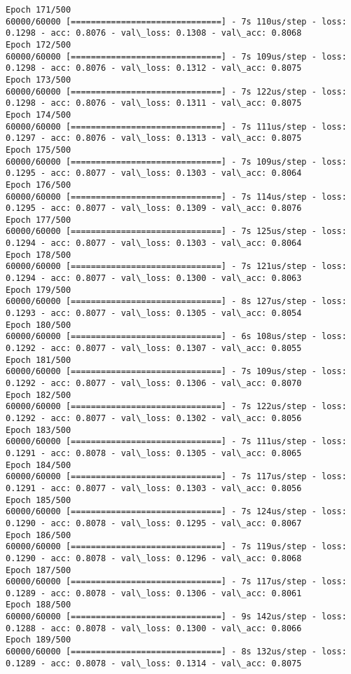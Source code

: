 \documentclass[11pt]{article}
\begin{document}
\begin{Verbatim}[commandchars=\\\{\}]
Epoch 171/500
60000/60000 [==============================] - 7s 110us/step - loss: 0.1298 - acc: 0.8076 - val\_loss: 0.1308 - val\_acc: 0.8068
Epoch 172/500
60000/60000 [==============================] - 7s 109us/step - loss: 0.1298 - acc: 0.8076 - val\_loss: 0.1312 - val\_acc: 0.8075
Epoch 173/500
60000/60000 [==============================] - 7s 122us/step - loss: 0.1298 - acc: 0.8076 - val\_loss: 0.1311 - val\_acc: 0.8075
Epoch 174/500
60000/60000 [==============================] - 7s 111us/step - loss: 0.1297 - acc: 0.8076 - val\_loss: 0.1313 - val\_acc: 0.8075
Epoch 175/500
60000/60000 [==============================] - 7s 109us/step - loss: 0.1295 - acc: 0.8077 - val\_loss: 0.1303 - val\_acc: 0.8064
Epoch 176/500
60000/60000 [==============================] - 7s 114us/step - loss: 0.1295 - acc: 0.8077 - val\_loss: 0.1309 - val\_acc: 0.8076
Epoch 177/500
60000/60000 [==============================] - 7s 125us/step - loss: 0.1294 - acc: 0.8077 - val\_loss: 0.1303 - val\_acc: 0.8064
Epoch 178/500
60000/60000 [==============================] - 7s 121us/step - loss: 0.1294 - acc: 0.8077 - val\_loss: 0.1300 - val\_acc: 0.8063
Epoch 179/500
60000/60000 [==============================] - 8s 127us/step - loss: 0.1293 - acc: 0.8077 - val\_loss: 0.1305 - val\_acc: 0.8054
Epoch 180/500
60000/60000 [==============================] - 6s 108us/step - loss: 0.1292 - acc: 0.8077 - val\_loss: 0.1307 - val\_acc: 0.8055
Epoch 181/500
60000/60000 [==============================] - 7s 109us/step - loss: 0.1292 - acc: 0.8077 - val\_loss: 0.1306 - val\_acc: 0.8070
Epoch 182/500
60000/60000 [==============================] - 7s 122us/step - loss: 0.1292 - acc: 0.8077 - val\_loss: 0.1302 - val\_acc: 0.8056
Epoch 183/500
60000/60000 [==============================] - 7s 111us/step - loss: 0.1291 - acc: 0.8078 - val\_loss: 0.1305 - val\_acc: 0.8065
Epoch 184/500
60000/60000 [==============================] - 7s 117us/step - loss: 0.1291 - acc: 0.8077 - val\_loss: 0.1303 - val\_acc: 0.8056
Epoch 185/500
60000/60000 [==============================] - 7s 124us/step - loss: 0.1290 - acc: 0.8078 - val\_loss: 0.1295 - val\_acc: 0.8067
Epoch 186/500
60000/60000 [==============================] - 7s 119us/step - loss: 0.1290 - acc: 0.8078 - val\_loss: 0.1296 - val\_acc: 0.8068
Epoch 187/500
60000/60000 [==============================] - 7s 117us/step - loss: 0.1289 - acc: 0.8078 - val\_loss: 0.1306 - val\_acc: 0.8061
Epoch 188/500
60000/60000 [==============================] - 9s 142us/step - loss: 0.1288 - acc: 0.8078 - val\_loss: 0.1300 - val\_acc: 0.8066
Epoch 189/500
60000/60000 [==============================] - 8s 132us/step - loss: 0.1289 - acc: 0.8078 - val\_loss: 0.1314 - val\_acc: 0.8075

\end{Verbatim}
\end{document}
